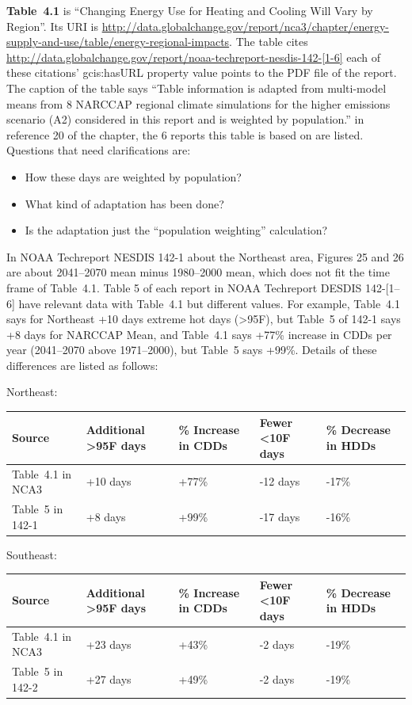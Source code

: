 \textbf{Table~4.1} is ``Changing Energy Use for Heating and Cooling Will Vary by Region''. Its 
URI is \url{http://data.globalchange.gov/report/nca3/chapter/energy-supply-and-use/table/energy-regional-impacts}.
The table cites \url{http://data.globalchange.gov/report/noaa-techreport-nesdis-142-[1-6]} each of these citations' gcis:hasURL property value points to the PDF file of the report.
The caption of the table says ``Table information is adapted from multi-model means from 8 NARCCAP regional climate simulations for the higher emissions scenario (A2) considered in this report and is weighted by population.'' in reference 20 of the chapter, the 6 reports this table is based on are listed.
Questions that need clarifications are:
\begin{itemize}
\item How these days are weighted by population? 
\item What kind of adaptation has been done? 
\item Is the adaptation just the ``population weighting'' calculation?
\end{itemize}
In NOAA Techreport NESDIS 142-1 about the Northeast area, Figures 25 and 26 are about 2041--2070 mean minus 1980--2000 mean, which does not fit the time frame of Table~4.1.
Table 5 of each report in NOAA Techreport DESDIS 142-[1--6] have relevant data with Table~4.1 but different values.
For example, Table~4.1 says for Northeast +10 days extreme hot days (>95F), but Table~5 of 142-1 says +8 days for NARCCAP Mean, and Table~4.1 says +77\% increase in CDDs per year (2041--2070 above 1971--2000), but Table~5 says +99\%. Details of these differences are listed as follows:

Northeast:

\begin{tabular}{|l|p{}|p{}|p{}|p{}|}
	\hline
Source & Additional >95F days & \% Increase in CDDs & Fewer <10F days & \% Decrease in HDDs \\ 
\hline
Table~4.1 in NCA3	& +10 days & +77\% & -12 days & -17\% \\ 
\hline
Table~5 in 142-1	& +8 days & +99\% & -17 days & -16\% \\
\hline
\end{tabular}

\mbox{}

Southeast:

\begin{tabular}{|l|p{}|p{}|p{}|p{}|}
	\hline
	Source & Additional >95F days & \% Increase in CDDs & Fewer <10F days & \% Decrease in HDDs \\ 
	\hline
Table~4.1 in NCA3 & +23 days & +43\% & -2 days & -19\% \\
\hline
Table~5 in 142-2 & +27 days & +49\% & -2 days & -19\% \\
\hline
\end{tabular}

